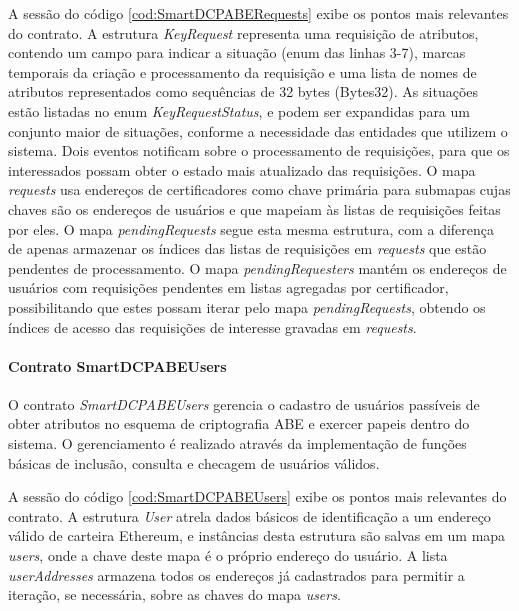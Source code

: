 \documentclass[a4paper,11pt]{article}
\begin{document}

A sessão do código \ref{cod:SmartDCPABERequests} exibe os pontos mais relevantes do contrato.
A estrutura \emph{KeyRequest} representa uma requisição de atributos, contendo um campo para indicar a situação (enum das linhas 3-7), marcas temporais da criação e processamento da requisição e uma lista de nomes de atributos representados como sequências de 32 bytes (Bytes32).
As situações estão listadas no enum \emph{KeyRequestStatus}, e podem ser expandidas para um conjunto maior de situações, conforme a necessidade das entidades que utilizem o sistema.
Dois eventos notificam sobre o processamento de requisições, para que os interessados possam obter  o estado mais atualizado das requisições.
O mapa \emph{requests} usa endereços de certificadores como chave primária para submapas cujas chaves são os endereços de usuários e que mapeiam às listas de requisições feitas por eles.
O mapa \emph{pendingRequests} segue esta mesma estrutura, com a diferença de apenas armazenar os índices das listas de requisições em \emph{requests} que estão pendentes de processamento.
O mapa \emph{pendingRequesters} mantém os endereços de usuários com requisições pendentes em listas agregadas por certificador, possibilitando que estes possam iterar pelo mapa \emph{pendingRequests}, obtendo os índices de acesso das requisições de interesse gravadas em \emph{requests}.

\paragraph{Contrato SmartDCPABEUsers}



O contrato \emph{SmartDCPABEUsers} gerencia o cadastro de usuários passíveis de obter atributos no esquema de criptografia ABE e exercer papeis dentro do sistema.
O gerenciamento é realizado através da implementação de funções básicas de inclusão, consulta e checagem de usuários válidos.

A sessão do código \ref{cod:SmartDCPABEUsers} exibe os pontos mais relevantes do contrato. A estrutura \emph{User} atrela dados básicos de identificação a um endereço válido de carteira Ethereum, e instâncias desta estrutura são salvas em um mapa \emph{users}, onde a chave deste mapa é o próprio endereço do usuário.
A lista \emph{userAddresses} armazena todos os endereços já cadastrados para permitir a iteração, se necessária, sobre as chaves do mapa \emph{users}.
\end{document}
